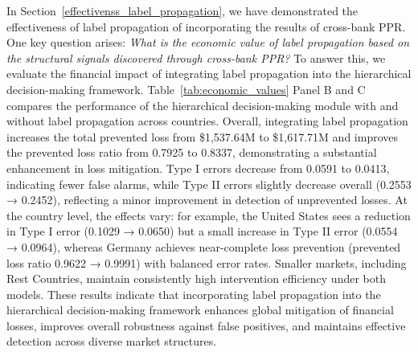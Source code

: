 In Section~\ref{effectivenss_label_propagation}, we have demonstrated the effectiveness of label propagation of incorporating the results of cross-bank PPR. One key question arises: \textit{What is the economic value of label propagation based on the structural signals discovered through cross-bank PPR?} To answer this, we evaluate the financial impact of integrating label propagation into the hierarchical decision-making framework. Table~\ref{tab:economic_values} Panel B and C compares the performance of the hierarchical decision-making module with and without label propagation across countries. Overall, integrating label propagation increases the total prevented loss from \$1,537.64M to \$1,617.71M and improves the prevented loss ratio from 0.7925 to 0.8337, demonstrating a substantial enhancement in loss mitigation. Type I errors decrease from 0.0591 to 0.0413, indicating fewer false alarms, while Type II errors slightly decrease overall (0.2553 → 0.2452), reflecting a minor improvement in detection of unprevented losses. At the country level, the effects vary: for example, the United States sees a reduction in Type I error (0.1029 → 0.0650) but a small increase in Type II error (0.0554 → 0.0964), whereas Germany achieves near-complete loss prevention (prevented loss ratio 0.9622 → 0.9991) with balanced error rates. Smaller markets, including Rest Countries, maintain consistently high intervention efficiency under both models. These results indicate that incorporating label propagation into the hierarchical decision-making framework enhances global mitigation of financial losses, improves overall robustness against false positives, and maintains effective detection across diverse market structures.


